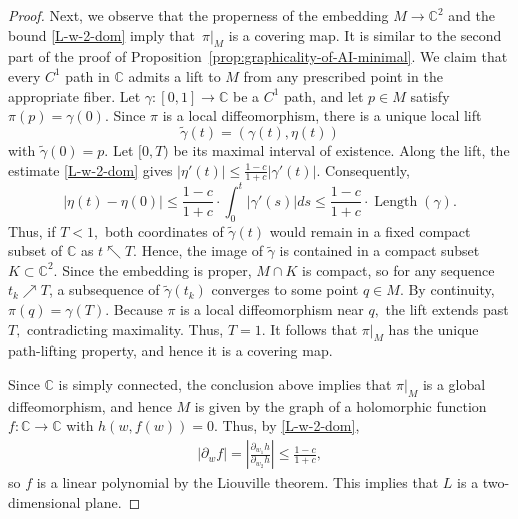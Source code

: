 \documentclass[11pt]{amsart}
\numberwithin{equation}{section}
\theoremstyle{definition}
\theoremstyle{definition}
\newcommand{\pr}[1]{\left(#1\right)}
\newcommand{\abs}[1]{\left|#1\right|}
\newcommand{\bb}[1]{\mathbb{#1}} \newcommand{\td}[1]{\widetilde{#1}}
\newcommand{\bd}{\partial}
\begin{document}
\begin{proof}
    
    Next, we observe that the properness of the embedding $M\to\bb C^2$ and the bound \eqref{L-w-2-dom} imply that~$\pi|_M$ is a covering map.
    It is similar to the second part of the proof of Proposition~\ref{prop:graphicality-of-AI-minimal}.
    We claim that every $C^1$ path in $\bb C$ admits a lift to $M$ from any prescribed point in the appropriate fiber. 
    Let $\gamma\colon[0,1]\to\bb C$ be a $C^1$ path, and let $p\in M$ satisfy $\pi(p)=\gamma(0).$ 
    Since $\pi$ is a local diffeomorphism, there is a unique local lift
    $$\td\gamma(t)=\pr{\gamma(t),\eta(t)}$$
    with $\td\gamma(0)=p.$ 
    Let $[0,T)$ be its maximal interval of existence.
    Along the lift, the estimate \eqref{L-w-2-dom} gives
    $|\eta'(t)|\le \frac{1-c}{1+c} |\gamma'(t)|.$
    Consequently,
    $$|\eta(t)-\eta(0)|
    \le \frac{1-c}{1+c} \cdot \int_0^t|\gamma'(s)|ds
    \le \frac{1-c}{1+c} \cdot \operatorname{Length}(\gamma).$$
    Thus, if $T<1,$ both coordinates of $\td\gamma(t)$ would remain in a fixed compact subset of $\mathbb C$ as $t\nwarrow T.$ 
    Hence, the image of $\td\gamma$ is contained in a compact subset $K\subset\bb C^2$.
    Since the embedding is proper, $M\cap K$
    is compact, so for any sequence $t_k\nearrow T$, a subsequence of $\td\gamma(t_k)$ converges to some point $q\in M.$ 
    By continuity, $\pi(q)=\gamma(T).$
    Because $\pi$ is a local diffeomorphism near $q,$ the lift extends past $T,$ contradicting maximality. 
    Thus, $T=1.$
    It follows that $\pi|_M$ has the unique path-lifting property, and hence it is a covering map.
    
    Since $\bb C$ is simply connected, the conclusion above implies that $\pi|_M$ is a global diffeomorphism, and hence $M$ is given by the graph of a holomorphic function $f\colon \bb C\to\bb C$ with $h\pr{w,f(w)}=0.$
    Thus, by \eqref{L-w-2-dom},
    \begin{align*}
    |\bd_w f| 
    = \abs{\frac{\bd_{w_1}h}{\bd_{w_2}h}}
    \le \frac{1-c}{1+c},
    \end{align*}
    so $f$ is a linear polynomial by the Liouville theorem.
    This implies that $L$ is a two-dimensional plane.
\end{proof}
\end{document}
